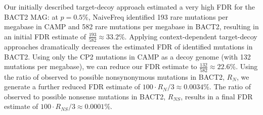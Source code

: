 Our initially described target-decoy approach estimated a very high FDR for the BACT2 MAG:
at $p = 0.5\%$, NaiveFreq identified 193 rare mutations per megabase in CAMP and 582 rare mutations per megabase in BACT2, resulting in an initial FDR estimate of $\frac{193}{582} \approx 33.2\%$.
Applying context-dependent target-decoy approaches dramatically decreases the estimated FDR of identified mutations in BACT2.
Using only the CP2 mutations in CAMP as a decoy genome (with 132 mutations per megabase), we can reduce our FDR estimate to $\frac{132}{582} \approx 22.6\%$.
Using the ratio of observed to possible nonsynonymous mutations in BACT2, $R_N$, we generate a further reduced FDR estimate of $100 \cdot R_N / 3 \approx 0.0034\%$.
The ratio of observed to possible nonsense mutations in BACT2, $R_{NS}$, results in a final FDR estimate of $100 \cdot R_{NS} / 3 \approx 0.0001\%$.\endinput